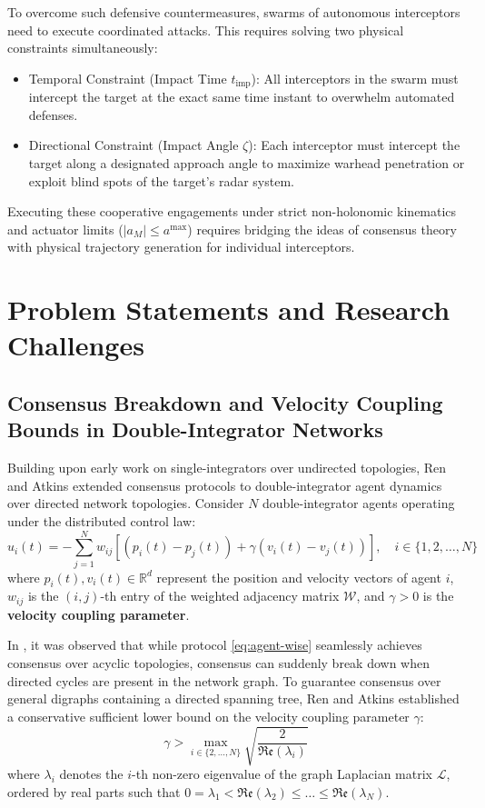 To overcome such defensive countermeasures, swarms of autonomous interceptors need to execute coordinated attacks. This requires solving two physical constraints simultaneously:
\begin{itemize}
    \item Temporal Constraint (Impact Time $t_{\text{imp}}$): All interceptors in the swarm must intercept the target at the exact same time instant to overwhelm automated defenses.
    \item Directional Constraint (Impact Angle $\zeta$): Each interceptor must intercept the target along a designated approach angle to maximize warhead penetration or exploit blind spots of the target's radar system.
\end{itemize}
Executing these cooperative engagements under strict non-holonomic kinematics and actuator limits ($\vert{}a_M\vert{} \le a^{\text{max}}$) requires bridging the ideas of consensus theory with physical trajectory generation for individual interceptors.
\section{Problem Statements and Research Challenges}
\subsection{Consensus Breakdown and Velocity Coupling Bounds in Double-Integrator Networks}

Building upon early work on single-integrators over undirected topologies, Ren and Atkins \cite{ren2005second} extended consensus protocols to double-integrator agent dynamics over directed network topologies. Consider $N$ double-integrator agents operating under the distributed control law:
\begin{equation} \label{eq:agent-wise}
	u_i(t) = -\sum_{j=1}^{N} w_{ij} \left[ (p_i(t) - p_j(t)) + \gamma (v_i(t) - v_j(t)) \right], \quad i \in \{1, 2, \dots, N\}
\end{equation}
where $p_i(t), v_i(t) \in \mathbb{R}^d$ represent the position and velocity vectors of agent $i$, $w_{ij}$ is the $(i,j)$-th entry of the weighted adjacency matrix $\mathcal{W}$, and $\gamma > 0$ is the \textbf{velocity coupling parameter}.

In \cite{ren2005second}, it was observed that while protocol \eqref{eq:agent-wise} seamlessly achieves consensus over acyclic topologies, consensus can suddenly break down when directed cycles are present in the network graph. To guarantee consensus over general digraphs containing a directed spanning tree, Ren and Atkins established a conservative sufficient lower bound on the velocity coupling parameter $\gamma$:
\begin{equation}\label{eq:ren_gamma_bound}
    \gamma > \max_{i \in \{2, \dots, N\}} \sqrt{\frac{2}{\mathfrak{Re}(\lambda_i)}}
\end{equation}
where $\lambda_i$ denotes the $i$-th non-zero eigenvalue of the graph Laplacian matrix $\mathcal{L}$, ordered by real parts such that $0 = \lambda_1 < \mathfrak{Re}(\lambda_2) \le \dots \le \mathfrak{Re}(\lambda_N)$.

